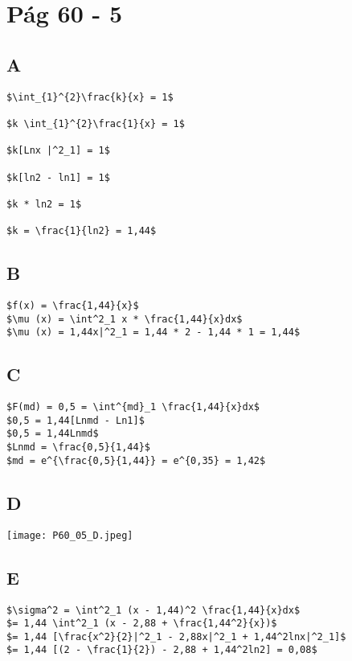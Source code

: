 \section*{Pág 60 - 5}
\subsection*{A}
\begin{lstlisting}[mathescape]
$\int_{1}^{2}\frac{k}{x} = 1$

$k \int_{1}^{2}\frac{1}{x} = 1$

$k[Lnx |^2_1] = 1$

$k[ln2 - ln1] = 1$

$k * ln2 = 1$

$k = \frac{1}{ln2} = 1,44$
\end{lstlisting}

\subsection*{B}
\begin{lstlisting}[mathescape]
$f(x) = \frac{1,44}{x}$
$\mu (x) = \int^2_1 x * \frac{1,44}{x}dx$
$\mu (x) = 1,44x|^2_1 = 1,44 * 2 - 1,44 * 1 = 1,44$
\end{lstlisting}

\subsection*{C}
\begin{lstlisting}[mathescape]
$F(md) = 0,5 = \int^{md}_1 \frac{1,44}{x}dx$
$0,5 = 1,44[Lnmd - Ln1]$
$0,5 = 1,44Lnmd$
$Lnmd = \frac{0,5}{1,44}$
$md = e^{\frac{0,5}{1,44}} = e^{0,35} = 1,42$
\end{lstlisting}

\subsection*{D}
\texttt{[image: P60\_05\_D.jpeg]}

\subsection*{E}
\begin{lstlisting}[mathescape]
$\sigma^2 = \int^2_1 (x - 1,44)^2 \frac{1,44}{x}dx$
$= 1,44 \int^2_1 (x - 2,88 + \frac{1,44^2}{x})$
$= 1,44 [\frac{x^2}{2}|^2_1 - 2,88x|^2_1 + 1,44^2lnx|^2_1]$
$= 1,44 [(2 - \frac{1}{2}) - 2,88 + 1,44^2ln2] = 0,08$
\end{lstlisting}
